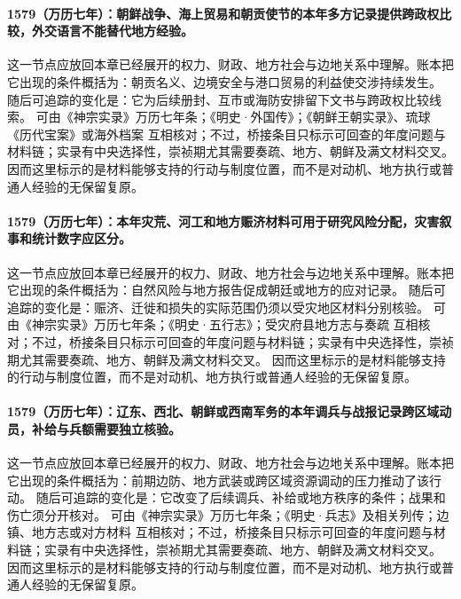 \paragraph{1579（万历七年）：朝鲜战争、海上贸易和朝贡使节的本年多方记录提供跨政权比较，外交语言不能替代地方经验。} 这一节点应放回本章已经展开的权力、财政、地方社会与边地关系中理解。账本把它出现的条件概括为：朝贡名义、边境安全与港口贸易的利益使交涉持续发生。 随后可追踪的变化是：它为后续册封、互市或海防安排留下文书与跨政权比较线索。 可由《神宗实录》万历七年条；《明史·外国传》；《朝鲜王朝实录》、琉球《历代宝案》或海外档案 互相核对；不过，桥接条目只标示可回查的年度问题与材料链；实录有中央选择性，崇祯期尤其需要奏疏、地方、朝鲜及满文材料交叉。 因而这里标示的是材料能够支持的行动与制度位置，而不是对动机、地方执行或普通人经验的无保留复原。

\paragraph{1579（万历七年）：本年灾荒、河工和地方赈济材料可用于研究风险分配，灾害叙事和统计数字应区分。} 这一节点应放回本章已经展开的权力、财政、地方社会与边地关系中理解。账本把它出现的条件概括为：自然风险与地方报告促成朝廷或地方的应对记录。 随后可追踪的变化是：赈济、迁徙和损失的实际范围仍须以受灾地区材料分别核验。 可由《神宗实录》万历七年条；《明史·五行志》；受灾府县地方志与奏疏 互相核对；不过，桥接条目只标示可回查的年度问题与材料链；实录有中央选择性，崇祯期尤其需要奏疏、地方、朝鲜及满文材料交叉。 因而这里标示的是材料能够支持的行动与制度位置，而不是对动机、地方执行或普通人经验的无保留复原。

\paragraph{1579（万历七年）：辽东、西北、朝鲜或西南军务的本年调兵与战报记录跨区域动员，补给与兵额需要独立核验。} 这一节点应放回本章已经展开的权力、财政、地方社会与边地关系中理解。账本把它出现的条件概括为：前期边防、地方武装或跨区域资源调动的压力推动了该行动。 随后可追踪的变化是：它改变了后续调兵、补给或地方秩序的条件；战果和伤亡须分开核对。 可由《神宗实录》万历七年条；《明史·兵志》及相关列传；边镇、地方志或对方材料 互相核对；不过，桥接条目只标示可回查的年度问题与材料链；实录有中央选择性，崇祯期尤其需要奏疏、地方、朝鲜及满文材料交叉。 因而这里标示的是材料能够支持的行动与制度位置，而不是对动机、地方执行或普通人经验的无保留复原。

